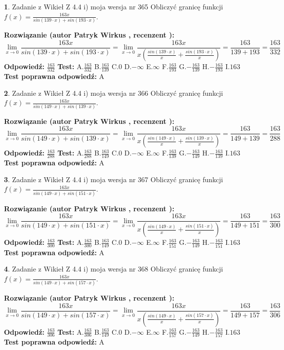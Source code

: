 \documentclass[12pt, a4paper]{article}
\theoremstyle{definition} %
\newtheorem{zad}{}
\newcommand{\zadStart}[1]{\begin{zad}#1\newline}
\newcommand{\zadStop}{\end{zad}}
\newcommand{\rozwStart}[2]{\noindent \textbf{Rozwiązanie (autor #1 , recenzent #2): }\newline}
\newcommand{\rozwStop}{\newline}
\newcommand{\odpStart}{\noindent \textbf{Odpowiedź:}\newline}
\newcommand{\odpStop}{\newline}
\newcommand{\testStart}{\noindent \textbf{Test:}\newline}
\newcommand{\testStop}{\newline}
\newcommand{\kluczStart}{\noindent \textbf{Test poprawna odpowiedź:}\newline}
\newcommand{\kluczStop}{\newline}
\begin{document}
\zadStart{Zadanie z Wikieł Z 4.4 i) moja wersja nr 365}
Obliczyć granicę funkcji $f(x)=\frac{163x}{sin(139\cdot x) +sin(193\cdot x)}$.
\zadStop
\rozwStart{Patryk Wirkus}{}
$$\lim\limits_{x\to 0}\frac{163x}{sin(139\cdot x) +sin(193\cdot x)}=\lim\limits_{x\to 0}\frac{163x}{x(\frac{sin(139\cdot x)}{x}+\frac{sin(193\cdot x)}{x})}=\frac{163}{139+193} = \frac{163}{332}$$
\rozwStop
\odpStart
$\frac{163}{332}$
\odpStop
\testStart
A.$\frac{163}{332}$
B.$\frac{163}{139}$
C.$0$
D.$-\infty$
E.$\infty$
F.$\frac{163}{193}$
G.$-\frac{163}{139}$
H.$-\frac{163}{193}$
I.$163$
\testStop
\kluczStart
A
\kluczStop



\zadStart{Zadanie z Wikieł Z 4.4 i) moja wersja nr 366}
Obliczyć granicę funkcji $f(x)=\frac{163x}{sin(149\cdot x) +sin(139\cdot x)}$.
\zadStop
\rozwStart{Patryk Wirkus}{}
$$\lim\limits_{x\to 0}\frac{163x}{sin(149\cdot x) +sin(139\cdot x)}=\lim\limits_{x\to 0}\frac{163x}{x(\frac{sin(149\cdot x)}{x}+\frac{sin(139\cdot x)}{x})}=\frac{163}{149+139} = \frac{163}{288}$$
\rozwStop
\odpStart
$\frac{163}{288}$
\odpStop
\testStart
A.$\frac{163}{288}$
B.$\frac{163}{149}$
C.$0$
D.$-\infty$
E.$\infty$
F.$\frac{163}{139}$
G.$-\frac{163}{149}$
H.$-\frac{163}{139}$
I.$163$
\testStop
\kluczStart
A
\kluczStop



\zadStart{Zadanie z Wikieł Z 4.4 i) moja wersja nr 367}
Obliczyć granicę funkcji $f(x)=\frac{163x}{sin(149\cdot x) +sin(151\cdot x)}$.
\zadStop
\rozwStart{Patryk Wirkus}{}
$$\lim\limits_{x\to 0}\frac{163x}{sin(149\cdot x) +sin(151\cdot x)}=\lim\limits_{x\to 0}\frac{163x}{x(\frac{sin(149\cdot x)}{x}+\frac{sin(151\cdot x)}{x})}=\frac{163}{149+151} = \frac{163}{300}$$
\rozwStop
\odpStart
$\frac{163}{300}$
\odpStop
\testStart
A.$\frac{163}{300}$
B.$\frac{163}{149}$
C.$0$
D.$-\infty$
E.$\infty$
F.$\frac{163}{151}$
G.$-\frac{163}{149}$
H.$-\frac{163}{151}$
I.$163$
\testStop
\kluczStart
A
\kluczStop



\zadStart{Zadanie z Wikieł Z 4.4 i) moja wersja nr 368}
Obliczyć granicę funkcji $f(x)=\frac{163x}{sin(149\cdot x) +sin(157\cdot x)}$.
\zadStop
\rozwStart{Patryk Wirkus}{}
$$\lim\limits_{x\to 0}\frac{163x}{sin(149\cdot x) +sin(157\cdot x)}=\lim\limits_{x\to 0}\frac{163x}{x(\frac{sin(149\cdot x)}{x}+\frac{sin(157\cdot x)}{x})}=\frac{163}{149+157} = \frac{163}{306}$$
\rozwStop
\odpStart
$\frac{163}{306}$
\odpStop
\testStart
A.$\frac{163}{306}$
B.$\frac{163}{149}$
C.$0$
D.$-\infty$
E.$\infty$
F.$\frac{163}{157}$
G.$-\frac{163}{149}$
H.$-\frac{163}{157}$
I.$163$
\testStop
\kluczStart
A
\kluczStop
\end{document}
